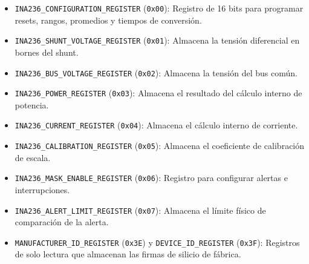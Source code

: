 \documentclass[
10pt, %
a4paper, %
oneside, %
headinclude,footinclude, %
BCOR5mm, %
]{scrartcl}
\begin{document}
\begin{itemize}
	\item \texttt{INA236\_CONFIGURATION\_REGISTER} (\texttt{0x00}): Registro de 16 bits para programar resets, rangos, promedios y tiempos de conversión.
	\item \texttt{INA236\_SHUNT\_VOLTAGE\_REGISTER} (\texttt{0x01}): Almacena la tensión diferencial en bornes del shunt.
	\item \texttt{INA236\_BUS\_VOLTAGE\_REGISTER} (\texttt{0x02}): Almacena la tensión del bus común.
	\item \texttt{INA236\_POWER\_REGISTER} (\texttt{0x03}): Almacena el resultado del cálculo interno de potencia.
	\item \texttt{INA236\_CURRENT\_REGISTER} (\texttt{0x04}): Almacena el cálculo interno de corriente.
	\item \texttt{INA236\_CALIBRATION\_REGISTER} (\texttt{0x05}): Almacena el coeficiente de calibración de escala.
	\item \texttt{INA236\_MASK\_ENABLE\_REGISTER} (\texttt{0x06}): Registro para configurar alertas e interrupciones.
	\item \texttt{INA236\_ALERT\_LIMIT\_REGISTER} (\texttt{0x07}): Almacena el límite físico de comparación de la alerta.
	\item \texttt{MANUFACTURER\_ID\_REGISTER} (\texttt{0x3E}) y \texttt{DEVICE\_ID\_REGISTER} (\texttt{0x3F}): Registros de solo lectura que almacenan las firmas de silicio de fábrica.
\end{itemize}
\end{document}
